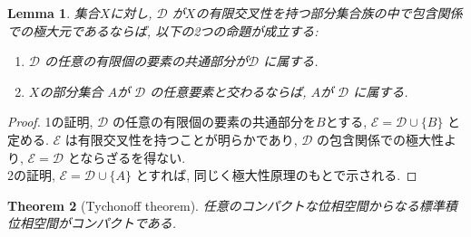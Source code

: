 \documentclass[lualatex]{ltjsbook}
\newtheorem{theorem}{Theorem}[chapter]
\newtheorem{lemma}[theorem]{Lemma}
\theoremstyle{remark}
\theoremstyle{plain}
\begin{document}
\begin{lemma}
	集合$X$に対し,   $\mathcal{D}$ が$X$の有限交叉性を持つ部分集合族の中で包含関係での極大元であるならば,  以下の2つの命題が成立する: 
	 \begin{enumerate}
		\item $\mathcal{D}$ の任意の有限個の要素の共通部分が$\mathcal{D}$ に属する.
		\item $X$の部分集合 $A$が $\mathcal{D}$ の任意要素と交わるならば,  $A$が $\mathcal{D}$ に属する.
	\end{enumerate}
\end{lemma}

\begin{proof}
	1の証明,  $\mathcal{D}$ の任意の有限個の要素の共通部分を$B$とする,   $\mathcal{E} = \mathcal{D}\cup \{B\} $ と定める. $\mathcal{E}$ は有限交叉性を持つことが明らかであり,  $\mathcal{D}$ の包含関係での極大性より,  $\mathcal{E}=\mathcal{D}$ とならざるを得ない.\\
	2の証明,  $\mathcal{E} = \mathcal{D} \cup \{A\} $ とすれば,  同じく極大性原理のもとで示される.
\end{proof}

\begin{theorem}[Tychonoff theorem]
	任意のコンパクトな位相空間からなる標準積位相空間がコンパクトである.
\end{theorem}
\end{document}
